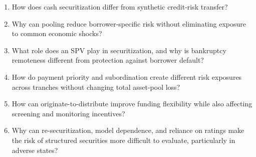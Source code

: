 

\begin{enumerate}

\item How does cash securitization differ from synthetic credit-risk transfer?

\item Why can pooling reduce borrower-specific risk without eliminating exposure to common economic shocks?

\item What role does an SPV play in securitization, and why is bankruptcy remoteness different from protection against borrower default?

\item How do payment priority and subordination create different risk exposures across tranches without changing total asset-pool loss?

\item How can originate-to-distribute improve funding flexibility while also affecting screening and monitoring incentives?

\item Why can re-securitization, model dependence, and reliance on ratings make the risk of structured securities more difficult to evaluate, particularly in adverse states?

\end{enumerate}




